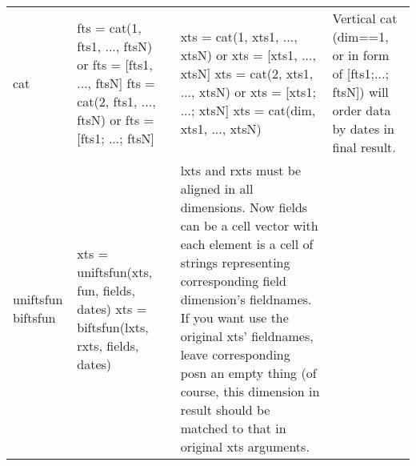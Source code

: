 \begin{landscape}
\begin{longtable}[c]{>{\ttfamily}l<{} p{7cm} p{8cm} p{6cm}}
cat &
      fts = cat(1, fts1, ..., ftsN) or fts = [fts1, ..., ftsN]\newline
      fts = cat(2, fts1, ..., ftsN) or fts = [fts1; ...; ftsN] &
      xts = cat(1, xts1, ..., xtsN) or xts = [xts1, ..., xtsN]\newline
      xts = cat(2, xts1, ..., xtsN) or xts = [xts1; ...; xtsN]\newline
      xts = cat(dim, xts1, ..., xtsN) &
      Vertical cat (dim==1, or in form of [fts1;...; ftsN]) will order data by dates in final result.\\
\rowcolor{ctwo}
uniftsfun\newline
biftsfun &
    xts = uniftsfun(xts, fun, fields, dates) \newline
    xts = biftsfun(lxts, rxts, fields, dates) &
    lxts and rxts must be aligned in all dimensions.
    Now fields can be a cell vector with each element is a cell of strings representing corresponding field dimension's fieldnames.
    If you want use the original xts' fieldnames, leave corresponding posn an empty thing 
    (of course, this dimension in result should be matched to that in original xts arguments.
\end{longtable}
\end{landscape}

